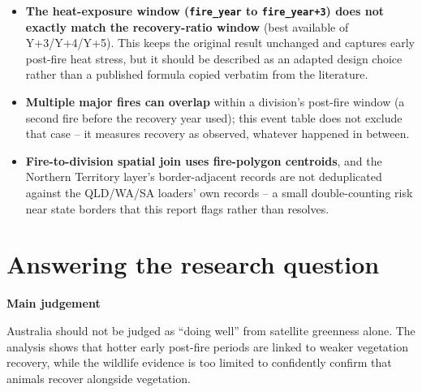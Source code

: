 \documentclass[
  letterpaper,
  DIV=11,
  numbers=noendperiod]{scrartcl}
\begin{document}
\begin{itemize}
{  in the fire year) sharply cuts the usable sample}, especially for
  sightings -- see the live counts printed above (\texttt{events\_all}
  vs \texttt{events}). This is the main reason the direct NDVI-heat and
  sightings-heat relationships can trade places in significance as more
  data/states are added, and why the gap-focused tests carry meaningful
  sampling uncertainty.
\item
  \textbf{The heat-exposure window (\texttt{fire\_year} to
  \texttt{fire\_year+3}) does not exactly match the recovery-ratio
  window} (best available of Y+3/Y+4/Y+5). This keeps the original
  result unchanged and captures early post-fire heat stress, but it
  should be described as an adapted design choice rather than a
  published formula copied verbatim from the literature.
\item
  \textbf{Multiple major fires can overlap} within a division's
  post-fire window (a second fire before the recovery year used); this
  event table does not exclude that case -- it measures recovery as
  observed, whatever happened in between.
\item
  \textbf{Fire-to-division spatial join uses fire-polygon centroids},
  and the Northern Territory layer's border-adjacent records are not
  deduplicated against the QLD/WA/SA loaders' own records -- a small
  double-counting risk near state borders that this report flags rather
  than resolves.
\end{itemize}

\section{Answering the research
question}\label{answering-the-research-question}

\begin{tcolorbox}[enhanced jigsaw, left=2mm, opacityback=0, colback=white, breakable, arc=.35mm, bottomrule=.15mm, rightrule=.15mm, toprule=.15mm, colframe=quarto-callout-important-color-frame, leftrule=.75mm]
\begin{minipage}[t]{5.5mm}
\textcolor{quarto-callout-important-color}{\faExclamation}
\end{minipage}%
\begin{minipage}[t]{\textwidth - 5.5mm}

\vspace{-3mm}\textbf{Main judgement}\vspace{3mm}

Australia should not be judged as ``doing well'' from satellite
greenness alone. The analysis shows that hotter early post-fire periods
are linked to weaker vegetation recovery, while the wildlife evidence is
too limited to confidently confirm that animals recover alongside
vegetation.

\end{minipage}%
\end{tcolorbox}
\end{document}
